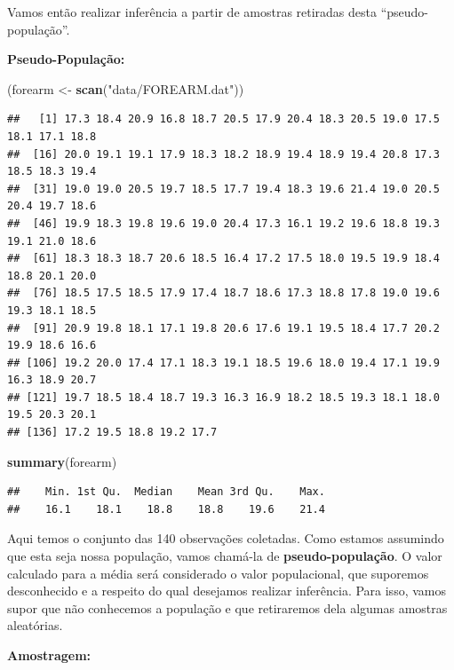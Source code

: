 \documentclass[
]{book}
\newenvironment{Shaded}{\begin{snugshade}}{\end{snugshade}}
\newcommand{\KeywordTok}[1]{\textcolor[rgb]{0.13,0.29,0.53}{\textbf{#1}}}
\newcommand{\NormalTok}[1]{#1}
\newcommand{\StringTok}[1]{\textcolor[rgb]{0.31,0.60,0.02}{#1}}
\theoremstyle{definition}
\theoremstyle{definition}
\theoremstyle{definition}
\theoremstyle{remark}
\begin{document}
Vamos então realizar inferência a partir de amostras retiradas desta ``pseudo-população''.

\textbf{Pseudo-População:}

\begin{Shaded}
\begin{Highlighting}[]
\NormalTok{(forearm <-}\StringTok{ }\KeywordTok{scan}\NormalTok{(}\StringTok{"data/FOREARM.dat"}\NormalTok{))}
\end{Highlighting}
\end{Shaded}

\begin{verbatim}
##   [1] 17.3 18.4 20.9 16.8 18.7 20.5 17.9 20.4 18.3 20.5 19.0 17.5 18.1 17.1 18.8
##  [16] 20.0 19.1 19.1 17.9 18.3 18.2 18.9 19.4 18.9 19.4 20.8 17.3 18.5 18.3 19.4
##  [31] 19.0 19.0 20.5 19.7 18.5 17.7 19.4 18.3 19.6 21.4 19.0 20.5 20.4 19.7 18.6
##  [46] 19.9 18.3 19.8 19.6 19.0 20.4 17.3 16.1 19.2 19.6 18.8 19.3 19.1 21.0 18.6
##  [61] 18.3 18.3 18.7 20.6 18.5 16.4 17.2 17.5 18.0 19.5 19.9 18.4 18.8 20.1 20.0
##  [76] 18.5 17.5 18.5 17.9 17.4 18.7 18.6 17.3 18.8 17.8 19.0 19.6 19.3 18.1 18.5
##  [91] 20.9 19.8 18.1 17.1 19.8 20.6 17.6 19.1 19.5 18.4 17.7 20.2 19.9 18.6 16.6
## [106] 19.2 20.0 17.4 17.1 18.3 19.1 18.5 19.6 18.0 19.4 17.1 19.9 16.3 18.9 20.7
## [121] 19.7 18.5 18.4 18.7 19.3 16.3 16.9 18.2 18.5 19.3 18.1 18.0 19.5 20.3 20.1
## [136] 17.2 19.5 18.8 19.2 17.7
\end{verbatim}

\begin{Shaded}
\begin{Highlighting}[]
\KeywordTok{summary}\NormalTok{(forearm)}
\end{Highlighting}
\end{Shaded}

\begin{verbatim}
##    Min. 1st Qu.  Median    Mean 3rd Qu.    Max. 
##    16.1    18.1    18.8    18.8    19.6    21.4
\end{verbatim}

Aqui temos o conjunto das 140 observações coletadas. Como estamos assumindo que esta seja nossa população, vamos chamá-la de \textbf{pseudo-população}. O valor calculado para a média será considerado o valor populacional, que suporemos desconhecido e a respeito do qual desejamos realizar inferência. Para isso, vamos supor que não conhecemos a população e que retiraremos dela algumas amostras aleatórias.

\textbf{Amostragem:}
\end{document}
